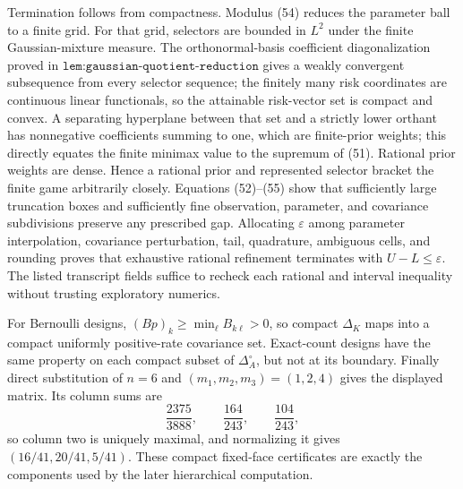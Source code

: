 Termination follows from compactness.  Modulus (54) reduces the parameter ball to a finite grid.  For that grid, selectors are bounded in \(L^2\) under the finite Gaussian-mixture measure.  The orthonormal-basis coefficient diagonalization proved in \(\texttt{lem:gaussian-quotient-reduction}\) gives a weakly convergent subsequence from every selector sequence; the finitely many risk coordinates are continuous linear functionals, so the attainable risk-vector set is compact and convex.  A separating hyperplane between that set and a strictly lower orthant has nonnegative coefficients summing to one, which are finite-prior weights; this directly equates the finite minimax value to the supremum of (51).  Rational prior weights are dense.  Hence a rational prior and represented selector bracket the finite game arbitrarily closely.  Equations (52)--(55) show that sufficiently large truncation boxes and sufficiently fine observation, parameter, and covariance subdivisions preserve any prescribed gap.  Allocating \(\varepsilon\) among parameter interpolation, covariance perturbation, tail, quadrature, ambiguous cells, and rounding proves that exhaustive rational refinement terminates with \(U-L\leq\varepsilon\).  The listed transcript fields suffice to recheck each rational and interval inequality without trusting exploratory numerics.

For Bernoulli designs, \((Bp)_k\geq\min_\ell B_{k\ell}>0\), so compact \(\Delta_K\) maps into a compact uniformly positive-rate covariance set.  Exact-count designs have the same property on each compact subset of \(\Delta_A^\circ\), but not at its boundary.  Finally direct substitution of \(n=6\) and \((m_1,m_2,m_3)=(1,2,4)\) gives the displayed matrix.  Its column sums are
\[
\frac{2375}{3888},\qquad\frac{164}{243},\qquad\frac{104}{243},
\]
so column two is uniquely maximal, and normalizing it gives \((16/41,20/41,5/41)\).  These compact fixed-face certificates are exactly the components used by the later hierarchical computation.